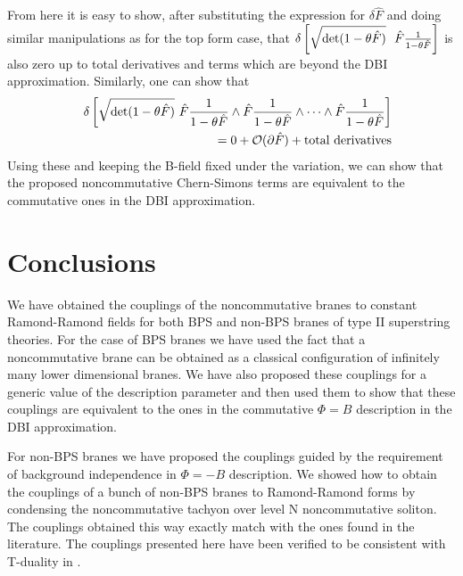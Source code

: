 \documentclass[a4paper,a4paper]{amsproc}
\theoremstyle{definition}
\theoremstyle{remark}
\numberwithin{equation}{section}
\begin{document}
From here it is easy to show, after substituting the expression for
$\delta\hat F$ and doing similar manipulations as for the top form
case, that $\delta \left[{\sqrt{\hbox{det}(1-\theta \hat F)}}~~\hat
F\frac{1}{1-\theta\hat F}\right]$ is also zero up to total derivatives
and terms which are beyond the DBI approximation. Similarly, one can
show that 
%
\begin{eqnarray}
&&\delta \left[{\sqrt{\hbox{det}(1-\theta \hat F)}}\,\,\hat
F\frac{1}{1-\theta\hat F}\wedge \hat F\frac{1}{1-\theta\hat
F}\wedge\dots\wedge \hat F\frac{1}{1-\theta\hat F} \right] \cr
&&= 0 + {\mathcal O}(\partial\hat F) + \hbox{total derivatives} 
\end{eqnarray}
%
Using these and keeping the B-field fixed under the variation, we can
show that the proposed noncommutative Chern-Simons terms are
equivalent to the commutative ones in the DBI approximation.



\section{Conclusions}
We have obtained the couplings of the noncommutative branes to constant
Ramond-Ramond fields for both BPS and non-BPS branes of type II
superstring theories. For the case of BPS branes we have used the fact
that a noncommutative brane can be obtained as a classical
configuration of infinitely many lower dimensional branes. We have
also proposed these couplings for a generic value of the description
parameter and then used them to show that these couplings are
equivalent to the ones in the commutative $\Phi = B$ description in the
DBI approximation. 

For non-BPS branes we have proposed the couplings guided by the
requirement of background independence in $\Phi = -B$ description. We
showed how to obtain the couplings of a bunch of non-BPS branes to
Ramond-Ramond forms by condensing the noncommutative tachyon over level N
noncommutative soliton. The couplings obtained this way exactly match
with the ones found in the literature. The couplings presented here
have been verified to be consistent with T-duality in \cite{tatar}.
\end{document}
